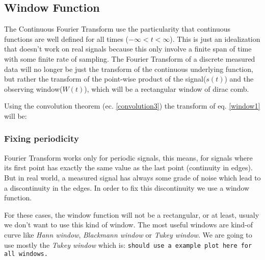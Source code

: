 \subsection{Window Function}{\label{subsec_window}}
\newp The Continuous Fourier Transform use the particularity that continuous functions are well defined for all times ($-\infty < t < \infty$). This is just an idealization that doesn't work on real signals because this only involve a finite span of time with some finite rate of sampling. The Fourier Transform of a discrete measured data will no longer be just the transform of the continuous underlying function, but rather the transform of the point-wise product of the signal($s(t)$) and the observing window($W(t)$), which will be a rectangular window of dirac comb.


\newp Using the convolution theorem (ec. \ref{convolution3}) the transform of eq. \ref{window1} will be:

\insertequation[\label{window2}]{\FF[s_{obs}(t)] = \FF[s(t)] * \FF[W(t)]}

\subsubsection{Fixing periodicity}{\label{subsubsec_fixperiod}}

\newp Fourier Transform works only for periodic signals, this means, for signals where its first point has exactly the same value as the last point (continuity in edges). But in real world, a measured signal has always some grade of noise which lead to a discontinuity in the edges. In order to fix this discontinuity we use a window function.

\newp For these cases, the window function will not be a rectangular, or at least, usualy we don't want to use this kind of window. The most useful windows are kind-of curve like \textit{Hann window}, \textit{Blackmann window} or \textit{Tukey window}. We are going to use mostly the \textit{Tukey window} which is: \texttt{should use a example plot here for all windows.}



